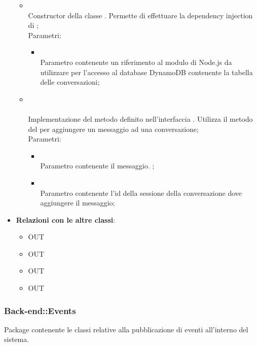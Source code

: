 \begin{itemize}
\begin{itemize}
		\item[]  \\		Constructor della classe . Permette di effettuare la dependency injection di ;\\
		Parametri:
		\begin{itemize}
			\item {} \\
			Parametro contenente un riferimento al modulo di Node.js da utilizzare per l'accesso al database DynamoDB contenente la tabella delle conversazioni;
		\end{itemize}
		\item[] \\ \\		Implementazione del metodo definito nell'interfaccia . Utilizza il metodo  del  per aggiungere un messaggio ad una conversazione;\\
		Parametri:
		\begin{itemize}
			\item {} \\
			Parametro contenente il messaggio.
			;
			\item {} \\
			Parametro contenente l'id della sessione della conversazione dove aggiungere il messaggio;
		\end{itemize}
	\end{itemize}
	\item \textbf{Relazioni con le altre classi}:
	\begin{itemize}
		\item OUT \hyperlink{ConversationMsg_label}{}
		\item OUT \hyperlink{ConversationObservable_label}{}
		\item OUT \hyperlink{Conversation_label}{}
		\item OUT \hyperlink{ErrorObservable_label}{}
	\end{itemize}
\end{itemize}
\FloatBarrier

\subsubsection{Back-end::Events}
Package contenente le classi relative alla pubblicazione di eventi all'interno del sistema.
